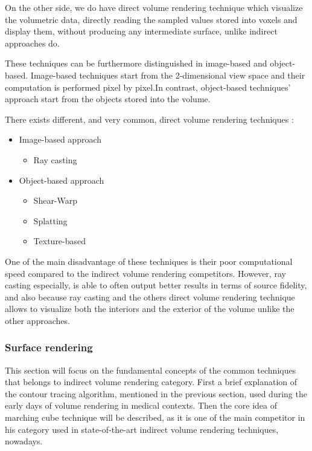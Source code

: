 \documentclass[12pt,a4paper]{extarticle}
\newcommand{\linespace}{\vspace{8pt}}
\begin{document}
On the other side, we do have direct volume rendering technique which visualize the volumetric data, directly reading the sampled values stored into voxels and display them, without producing any intermediate surface, unlike indirect approaches do. 
\linespace

These techniques can be furthermore distinguished in image-based and object-based. Image-based techniques start from the 2-dimensional view space and their computation is performed pixel by pixel.In contrast, object-based techniques' approach start from the objects stored into the volume. 

There exists different, and very common, direct volume rendering techniques :
\begin{itemize}
\item Image-based approach
\begin{itemize}
\item Ray casting
\end{itemize}
\item Object-based approach
\begin{itemize}
\item Shear-Warp
\item Splatting
\item Texture-based
\end{itemize}
\end{itemize}

One of the main disadvantage of these techniques is their poor computational speed compared to the indirect volume rendering competitors. However, ray casting especially, is able to often output better results in terms of source fidelity, and also because ray casting and the others direct volume rendering technique allows to visualize both the interiors and the exterior of the volume unlike the other approaches.

\subsubsection{Surface rendering} %
This section will focus on the fundamental concepts of the common techniques that belongs to indirect volume rendering category. First a brief explanation of the contour tracing algorithm, mentioned in the previous section, used during the early days of volume rendering in medical contexts. Then the core idea of marching cube technique will be described, as it is one of the main competitor in his category used in state-of-the-art indirect volume rendering techniques, nowadays.
\end{document}

